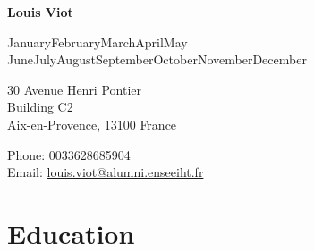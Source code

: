 \documentclass{article}
\def\name{Louis Viot}
\renewcommand{\today}{\ifcase \month \or January\or February\or March\or April\or May%
\or June\or July\or August\or September\or October\or November\or December\fi%
\space \number \year}
\begin{document}
{\huge \bf \name}

\bigskip
\today

\bigskip
\begin{minipage}[t]{0.495\textwidth}
	30 Avenue Henri Pontier \\
    Building C2 \\
    Aix-en-Provence, 13100 France
\end{minipage}
\begin{minipage}[t]{0.495\textwidth}
  Phone: 0033628685904 \\
  Email: \href{mailto:louis.viot@alumni.enseeiht.fr}{louis.viot@alumni.enseeiht.fr} \\
\end{minipage}

\section*{Education}
\end{document}
